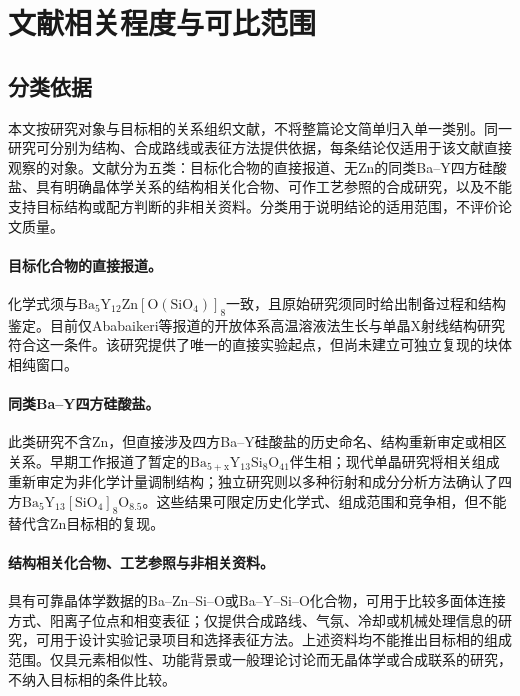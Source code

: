 \section{文献相关程度与可比范围}
\label{sec:evidence-distance}

\subsection{分类依据}

本文按研究对象与目标相的关系组织文献，不将整篇论文简单归入单一类别。同一研究可分别为结构、合成路线或表征方法提供依据，每条结论仅适用于该文献直接观察的对象。文献分为五类：目标化合物的直接报道、无Zn的同类Ba--Y四方硅酸盐、具有明确晶体学关系的结构相关化合物、可作工艺参照的合成研究，以及不能支持目标结构或配方判断的非相关资料。分类用于说明结论的适用范围，不评价论文质量。

\paragraph{目标化合物的直接报道。}化学式须与$\mathrm{Ba_5Y_{12}Zn[O(SiO_4)]_8}$一致，且原始研究须同时给出制备过程和结构鉴定。目前仅Ababaikeri等报道的开放体系高温溶液法生长与单晶X射线结构研究符合这一条件\cite{ababaikeri2024ba5y12zn}。该研究提供了唯一的直接实验起点，但尚未建立可独立复现的块体相纯窗口。

\paragraph{同类Ba--Y四方硅酸盐。}此类研究不含Zn，但直接涉及四方Ba--Y硅酸盐的历史命名、结构重新审定或相区关系。早期工作报道了暂定的$\mathrm{Ba_{5+x}Y_{13}Si_8O_{41}}$伴生相\cite{kolitsch2009crystal}；现代单晶研究将相关组成重新审定为非化学计量调制结构\cite{yamane2024synthesis}；独立研究则以多种衍射和成分分析方法确认了四方$\mathrm{Ba_5Y_{13}[SiO_4]_8O_{8.5}}$\CJKecglue{}\cite{gulay2024navigation}。这些结果可限定历史化学式、组成范围和竞争相，但不能替代含Zn目标相的复现。

\paragraph{结构相关化合物、工艺参照与非相关资料。}具有可靠晶体学数据的Ba--Zn--Si--O或Ba--Y--Si--O化合物，可用于比较多面体连接方式、阳离子位点和相变表征\cite{liu1993structures,lin1999phase,zou2021crystal,motozawa2022bay16si4o33}；仅提供合成路线、气氛、冷却或机械处理信息的研究，可用于设计实验记录项目和选择表征方法\cite{redhammer2003beta,pang2005study,tzvetkov2001effects}。上述资料均不能推出目标相的组成范围。仅具元素相似性、功能背景或一般理论讨论而无晶体学或合成联系的研究，不纳入目标相的条件比较\cite{buerger1954the,erlebach2020thermomechanical,gu2025liba2gasi2o8}。

